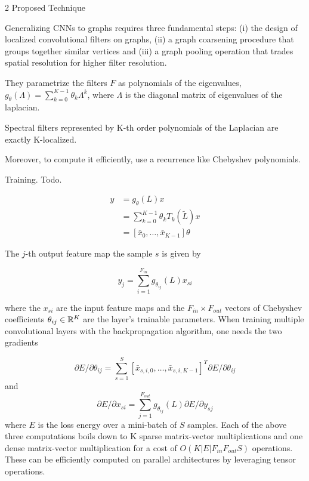 \documentclass[english]{article}
\begin{document}
\item 2 Proposed Technique

Generalizing CNNs to graphs requires three fundamental steps: (i) the design of localized convolutional filters on graphs, (ii) a graph coarsening procedure that groups together similar vertices and
(iii) a graph pooling operation that trades spatial resolution for higher filter resolution.

\item They parametrize the filters $F$ as polynomials of the eigenvalues, $g_\theta(\Lambda) = \sum_{k=0}^{K-1} \theta_k \Lambda^k$, where $\Lambda$ is the diagonal matrix of eigenvalues of the laplacian. 

Spectral filters represented by K-th order polynomials of the Laplacian are exactly K-localized.

\item Moreover, to compute it efficiently, use a recurrence like Chebyshev polynomials. 

\item Training. Todo.

\begin{align*}
y &= g_\theta(L) x\\
&= \sum_{k=0}^{K-1}\theta_k T_k(\tilde L)x\\
&=[\bar x_0, \ldots, \bar x_{K-1}]\theta
\end{align*}


The $j$-th output feature map  the sample $s$ is given by

$$y_j = \sum_{i=1}^{F_{in}} g_{\theta_{ij}}(L) x_{si} $$


where the $x_{si}$ are the input feature maps and the $F_{in} \times F_{out}$ vectors of Chebyshev coefficients $\theta_{ij} \in \mathbb{R}^K$ are the layer's trainable parameters. When training multiple convolutional layers with the backpropagation algorithm, one needs the two gradients

$$
\partial E/\partial{\theta_{ij}}
=
\sum_{s=1}^S
[\bar{x}_{s,i,0} ,\ldots, \bar{x}_{s,i,K-1}]^T
\partial E/\partial{\theta_{ij}}
$$
and 
$$
\partial E/\partial{x_{si}}
=
\sum_{j=1}^{F_{out}}
 g_{\theta_{ij}}(L)
\partial E/\partial{y_{sj}}
$$
where $E$ is the loss energy over a mini-batch of $S$ samples. Each of the above three computations boils down to K sparse matrix-vector multiplications and one dense matrix-vector multiplication for
a cost of $O(K|E|F_{in} F_{out} S)$ operations. These can be efficiently computed on parallel architectures
by leveraging tensor operations.
\end{document}
